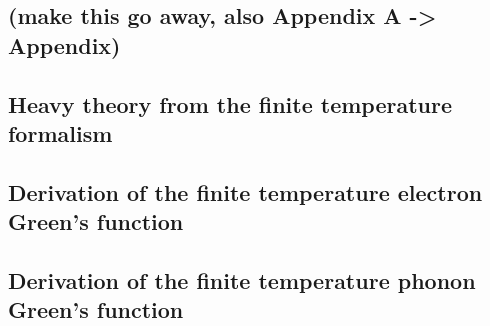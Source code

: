 \documentclass[12pt]{report}
\begin{document}
\begin{appendices}
\chapter{(make this go away, also Appendix A -> Appendix)}

\section{Heavy theory from the finite temperature formalism}

\section{Derivation of the finite temperature electron Green's function}

\section{Derivation of the finite temperature phonon Green's function}
\end{appendices}



\end{document}
